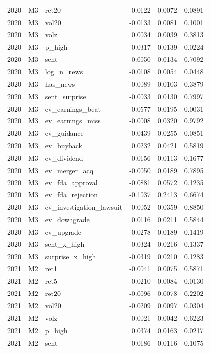 \begin{tabular}{rllrrr}
2020 & M3 & ret20 & -0.0122 & 0.0072 & 0.0891 \\
2020 & M3 & vol20 & -0.0133 & 0.0081 & 0.1001 \\
2020 & M3 & volz & 0.0034 & 0.0039 & 0.3813 \\
2020 & M3 & p\_high & 0.0317 & 0.0139 & 0.0224 \\
2020 & M3 & sent & 0.0050 & 0.0134 & 0.7092 \\
2020 & M3 & log\_n\_news & -0.0108 & 0.0054 & 0.0448 \\
2020 & M3 & has\_news & 0.0089 & 0.0103 & 0.3879 \\
2020 & M3 & sent\_surprise & -0.0033 & 0.0130 & 0.7997 \\
2020 & M3 & ev\_earnings\_beat & 0.0577 & 0.0195 & 0.0031 \\
2020 & M3 & ev\_earnings\_miss & -0.0008 & 0.0320 & 0.9792 \\
2020 & M3 & ev\_guidance & 0.0439 & 0.0255 & 0.0851 \\
2020 & M3 & ev\_buyback & 0.0232 & 0.0421 & 0.5819 \\
2020 & M3 & ev\_dividend & 0.0156 & 0.0113 & 0.1677 \\
2020 & M3 & ev\_merger\_acq & -0.0050 & 0.0189 & 0.7895 \\
2020 & M3 & ev\_fda\_approval & -0.0881 & 0.0572 & 0.1235 \\
2020 & M3 & ev\_fda\_rejection & -0.1037 & 0.2413 & 0.6674 \\
2020 & M3 & ev\_investigation\_lawsuit & -0.0052 & 0.0359 & 0.8850 \\
2020 & M3 & ev\_downgrade & 0.0116 & 0.0211 & 0.5844 \\
2020 & M3 & ev\_upgrade & 0.0278 & 0.0189 & 0.1419 \\
2020 & M3 & sent\_x\_high & 0.0324 & 0.0216 & 0.1337 \\
2020 & M3 & surprise\_x\_high & -0.0319 & 0.0210 & 0.1283 \\
2021 & M2 & ret1 & -0.0041 & 0.0075 & 0.5871 \\
2021 & M2 & ret5 & -0.0210 & 0.0084 & 0.0130 \\
2021 & M2 & ret20 & -0.0096 & 0.0078 & 0.2202 \\
2021 & M2 & vol20 & -0.0209 & 0.0097 & 0.0304 \\
2021 & M2 & volz & 0.0021 & 0.0042 & 0.6223 \\
2021 & M2 & p\_high & 0.0374 & 0.0163 & 0.0217 \\
2021 & M2 & sent & 0.0186 & 0.0116 & 0.1075 \\

\end{tabular}

